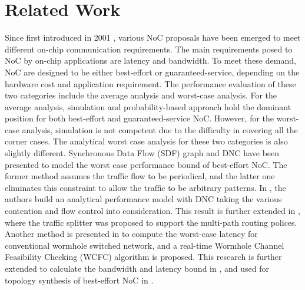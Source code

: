 \documentclass[10pt,journal]{IEEEtran}
\begin{document}
\section{Related Work}\label{related}
Since first introduced in 2001 \cite{DaTo01}, various NoC proposals have been emerged to meet different on-chip communication requirements. The main requirements posed to NoC by on-chip applications are latency and bandwidth. To meet these demand, NoC are designed to be either best-effort or guaranteed-service, depending on the hardware cost and application requirement. The performance evaluation of these two categories include the average analysis and worst-case analysis. For the average analysis, simulation and probability-based approach hold the dominant position for both best-effort and guaranteed-service NoC. However, for the worst-case analysis, simulation is not competent due to the difficulty in covering all the corner cases. The analytical worst case analysis for these two categories is also slightly different. Synchronous Data Flow (SDF) graph \cite{poplavko2003task} and DNC \cite{qian2009analysis} have been presented to model the worst case performance bound of best-effort NoC. The former method assumes the traffic flow to be periodical, and the latter one eliminates this constraint to allow the traffic to be arbitrary patterns. In \cite{qian2009analysis}, the authors build an analytical performance model with DNC taking the various contention and flow control into consideration. This result is further extended in \cite{Du:2012:WPA:2380445.2380469}, where the traffic splitter was proposed to support the multi-path routing polices. Another method is presented in \cite{Lee:2003:RWC:846077.846083} to compute the worst-case latency for conventional wormhole switched network, and a real-time Wormhole Channel Feasibility Checking (WCFC) algorithm is proposed. This research is further extended to calculate the bandwidth and latency bound in \cite{6109240}, and used for topology synthesis of best-effort NoC in \cite{EPFL-ARTICLE-186879}.
\end{document}
